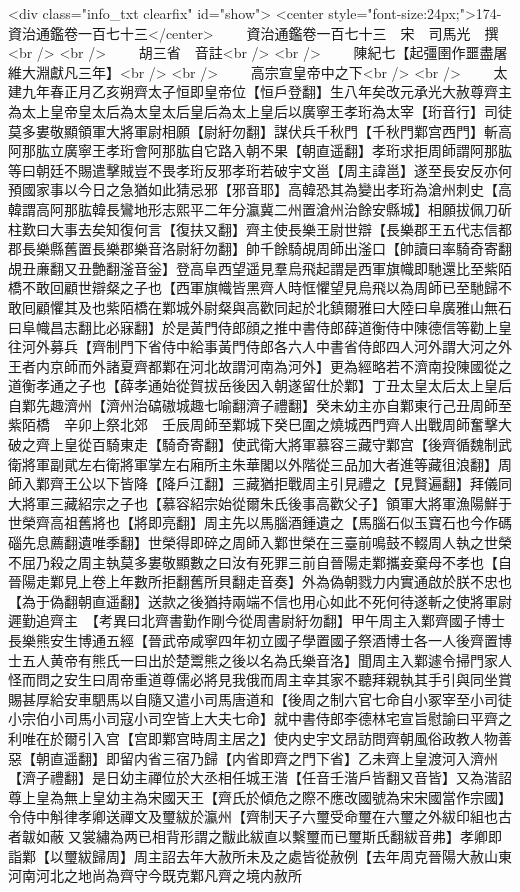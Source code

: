 <div class="info_txt clearfix" id="show">
<center style="font-size:24px;">174-資治通鑑卷一百七十三</center>
  　　資治通鑑卷一百七十三　宋　司馬光　撰<br />
<br />
　　胡三省　音註<br />
<br />
　　陳紀七【起彊圉作噩盡屠維大淵獻凡三年】<br />
<br />
　　高宗宣皇帝中之下<br />
<br />
　　太建九年春正月乙亥朔齊太子恒即皇帝位【恒戶登翻】生八年矣改元承光大赦尊齊主為太上皇帝皇太后為太皇太后皇后為太上皇后以廣寧王孝珩為太宰【珩音行】司徒莫多婁敬顯領軍大將軍尉相願【尉紆勿翻】謀伏兵千秋門【千秋門鄴宫西門】斬高阿那肱立廣寧王孝珩會阿那肱自它路入朝不果【朝直遥翻】孝珩求拒周師謂阿那肱等曰朝廷不賜遣擊賊豈不畏孝珩反邪孝珩若破宇文邕【周主諱邕】遂至長安反亦何預國家事以今日之急猶如此猜忌邪【邪音耶】高韓恐其為變出孝珩為滄州刺史【高韓謂高阿那肱韓長鸞地形志熙平二年分瀛冀二州置滄州治餘安縣城】相願拔佩刀斫柱歎曰大事去矣知復何言【復扶又翻】齊主使長樂王尉世辯【長樂郡王五代志信都郡長樂縣舊置長樂郡樂音洛尉紆勿翻】帥千餘騎覘周師出滏口【帥讀曰率騎奇寄翻覘丑亷翻又丑艶翻滏音釡】登高阜西望遥見羣烏飛起謂是西軍旗幟即馳還比至紫陌橋不敢回顧世辯粲之子也【西軍旗幟皆黑齊人時恇懼望見烏飛以為周師已至馳歸不敢囘顧懼其及也紫陌橋在鄴城外尉粲與高歡同起於北鎮爾雅曰大陸曰阜廣雅山無石曰阜幟昌志翻比必寐翻】於是黃門侍郎顔之推中書侍郎薛道衡侍中陳德信等勸上皇往河外募兵【齊制門下省侍中給事黃門侍郎各六人中書省侍郎四人河外謂大河之外王者内京師而外諸夏齊都鄴在河北故謂河南為河外】更為經略若不濟南投陳國從之道衡孝通之子也【薛孝通始從賀拔岳後因入朝遂留仕於鄴】丁丑太皇太后太上皇后自鄴先趣濟州【濟州治碻磝城趣七喻翻濟子禮翻】癸未幼主亦自鄴東行己丑周師至紫陌橋　辛卯上祭北郊　壬辰周師至鄴城下癸巳圍之燒城西門齊人出戰周師奮擊大破之齊上皇從百騎東走【騎奇寄翻】使武衛大將軍慕容三藏守鄴宫【後齊循魏制武衛將軍副貮左右衛將軍掌左右廂所主朱華閣以外階從三品加大者進等藏徂浪翻】周師入鄴齊王公以下皆降【降戶江翻】三藏猶拒戰周主引見禮之【見賢遍翻】拜儀同大將軍三藏紹宗之子也【慕容紹宗始從爾朱氏後事高歡父子】領軍大將軍漁陽鮮于世榮齊高祖舊將也【將即亮翻】周主先以馬腦酒鍾遺之【馬腦石似玉寶石也今作碼碯先息薦翻遺唯季翻】世榮得即碎之周師入鄴世榮在三臺前鳴鼓不輟周人執之世榮不屈乃殺之周主執莫多婁敬顯數之曰汝有死罪三前自晉陽走鄴攜妾棄母不孝也【自晉陽走鄴見上卷上年數所拒翻舊所貝翻走音奏】外為偽朝戮力内實通啟於朕不忠也【為于偽翻朝直遥翻】送款之後猶持兩端不信也用心如此不死何待遂斬之使將軍尉遲勤追齊主　【考異曰北齊書勤作剛今從周書尉紆勿翻】甲午周主入鄴齊國子博士長樂熊安生博通五經【晉武帝咸寧四年初立國子學置國子祭酒博士各一人後齊置博士五人黄帝有熊氏一曰出於楚鬻熊之後以名為氏樂音洛】聞周主入鄴遽令掃門家人怪而問之安生曰周帝重道尊儒必將見我俄而周主幸其家不聽拜親執其手引與同坐賞賜甚厚給安車駟馬以自隨又遣小司馬唐道和【後周之制六官七命自小冢宰至小司徒小宗伯小司馬小司寇小司空皆上大夫七命】就中書侍郎李德林宅宣旨慰諭曰平齊之利唯在於爾引入宫【宫即鄴宫時周主居之】使内史宇文昂訪問齊朝風俗政教人物善惡【朝直遥翻】即留内省三宿乃歸【内省即齊之門下省】乙未齊上皇渡河入濟州【濟子禮翻】是日幼主禪位於大丞相任城王湝【任音壬湝戶皆翻又音皆】又為湝詔尊上皇為無上皇幼主為宋國天王【齊氏於傾危之際不應改國號為宋宋國當作宗國】令侍中斛律孝卿送禪文及璽紱於瀛州【齊制天子六璽受命璽在六璽之外紱印組也古者韍如蔽又裳繡為两已相背形謂之黻此紱直以繫璽而已璽斯氏翻紱音弗】孝卿即詣鄴【以璽紱歸周】周主詔去年大赦所未及之處皆從赦例【去年周克晉陽大赦山東河南河北之地尚為齊守今既克鄴凡齊之境内赦所